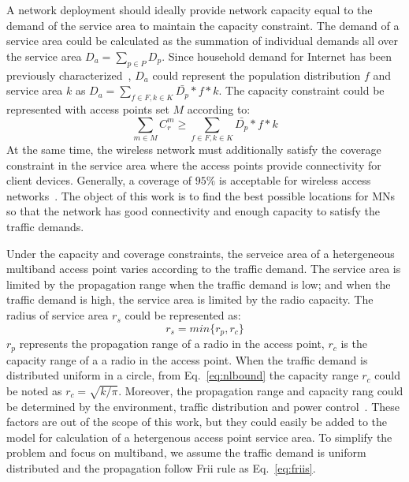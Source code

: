A network deployment should ideally provide network capacity equal to the demand of the service 
area to maintain the capacity constraint. The demand of a service area could be calculated as the 
summation of individual demands all over the service area $D_a=\sum_{p\in P}D_p$. Since 
household demand for Internet has been previously characterized~\cite{rosston2011household}, 
$D_a$ could represent the population distribution $f$ and service area $k$ as 
$D_a=\sum_{f \in F,k \in K}\bar{D_p}*f*k$. 
The capacity constraint could be represented with access points set $M$ according to:
\begin{equation}
\label{eq:nlbound}
\sum_{m \in M}C_r^m \ge \sum_{f \in F,k \in K}\bar{D_p}*f*k
\end{equation}
At the same time, the wireless network must additionally satisfy the coverage constraint in the service 
area where the access points provide connectivity for client devices. 
Generally, a coverage of $95\%$ is acceptable for wireless access networks~\cite{robinson2010deploying}.
The object of this work is to find the best possible locations for MNs so that the network has good 
connectivity and enough capacity to satisfy the traffic demands.


Under the capacity and coverage constraints, the serveice area of a hetergeneous multiband access point 
varies according to the traffic demand. The service area is limited by the propagation range when the traffic 
demand is low; and when the traffic demand is high, the service area is limited by the radio capacity.
The radius of service area $r_s$ could be represented as:
\begin{equation}
\label{eq:servicearea}
r_s=min\{r_p,r_c\}
\end{equation}
$r_p$ represents the propagation range of a radio in the access point, $r_c$ is the capacity range of 
a a radio in the access point. When the traffic demand is distributed uniform in a circle, from 
Eq.~\ref{eq:nlbound} the capacity range $r_c$ could be noted as $r_c=\sqrt{k/\pi}$. Moreover,
the propagation range and capacity rang could be determined by the environment, traffic distribution and
power control~\cite{robinson2010deploying}. These factors are out of the scope of this work, but they could
easily be added to the model for calculation of a hetergenous access point service area. To simplify the 
problem and focus on multiband, we assume the traffic demand is uniform distributed and the propagation 
follow Frii rule as Eq.~\ref{eq:friis}.

